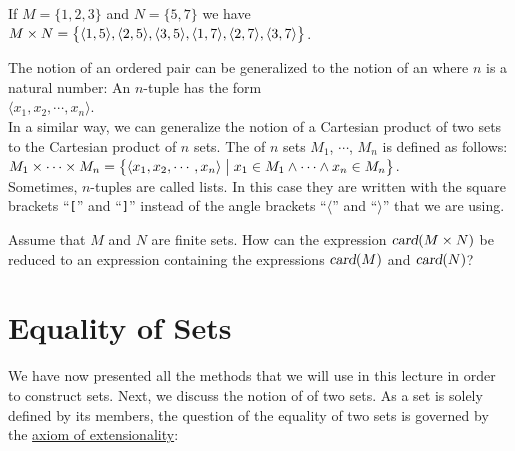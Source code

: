 \exampleEng
If $M = \{ 1, 2, 3 \}$ and $N = \{ 5, 7 \}$ we have
\\[0.2cm]
\hspace*{1.3cm} 
$M \times N = \bigl\{ \pair(1,5),\pair(2,5),\pair(3,5),\pair(1,7),\pair(2,7),\pair(3,7)\bigr\}$.
\eox
\vspace*{0.2cm}

\noindent
The notion of an ordered pair can be generalized to the notion of an
 where $n$ is a natural number: An $n$-tuple has the form
\\[0.2cm]
\hspace*{1.3cm} $\langle x_1, x_2, \cdots, x_n \rangle$. 
\\[0.2cm]
In a similar way, we can generalize the notion of a Cartesian product of two sets to the Cartesian product of
$n$ sets.  The  of $n$ sets  $M_1$, $\cdots$, $M_n$ is defined as follows: \\[0.2cm]
\hspace*{1.3cm}
$M_1 \times \cdots \times M_n =
  \big\{ \langle x_1,x_2,\cdots,x_n \rangle \bigm| x_1\in M_1 \wedge \cdots \wedge x_n \in M_n \big\}
$. 
\\[0.2cm]
Sometimes,  $n$-tuples are called lists.  In this case they are written with the square brackets ``\texttt{[}''
and ``\texttt{]}'' instead of the angle brackets ``$\langle$'' and ``$\rangle$'' that we are using.  

\exerciseEng
Assume that $M$ and $N$ are finite sets.  How can the expression $\textsl{card}(M \times N)$ be reduced to an
expression containing the expressions $\textsl{card}(M)$ and $\textsl{card}(N)$?
\eox

\section{Equality of Sets}
We have now presented all the methods that we will use in this lecture in order to construct sets.
Next, we discuss the notion of  of two sets.  As a set is solely defined by its members,
the question of the equality of two sets is governed by the 
\href{https://en.wikipedia.org/wiki/Axiom_of_extensionality}{axiom of extensionality}:
\vspace*{0.2cm}

\begin{center}     
\colorbox{red}{}
\end{center}
\vspace{0.2cm}

